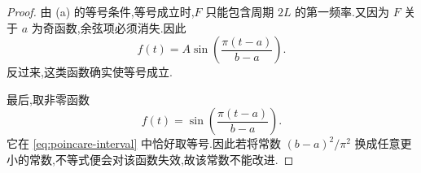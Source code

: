 \begin{proof}
	由 (a) 的等号条件,等号成立时,$F$ 只能包含周期 $2L$ 的第一频率.又因为 $F$ 关于 $a$ 为奇函数,余弦项必须消失.因此
	\[
		f(t)=A\sin\left(\frac{\pi(t-a)}{b-a}\right).
	\]
	反过来,这类函数确实使等号成立.

	最后,取非零函数
	\[
		f(t)=\sin\left(\frac{\pi(t-a)}{b-a}\right).
	\]
	它在 \eqref{eq:poincare-interval} 中恰好取等号.因此若将常数
	$(b-a)^2/\pi^2$ 换成任意更小的常数,不等式便会对该函数失效,故该常数不能改进.
\end{proof}

